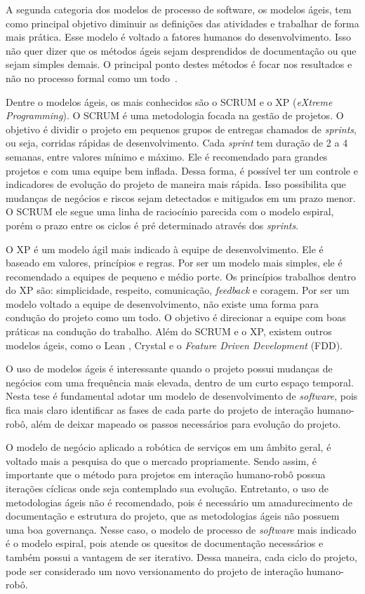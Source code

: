 A segunda categoria dos modelos de processo de software, os modelos ágeis, tem como principal objetivo diminuir as definições das atividades e trabalhar de forma mais prática. Esse modelo é voltado a fatores humanos do desenvolvimento. Isso não quer dizer que os métodos ágeis sejam desprendidos de documentação ou que sejam simples demais. O principal ponto destes métodos é focar nos resultados e não no processo formal como um todo~\cite{sommerville:2008}.

Dentre o modelos ágeis, os mais conhecidos são o SCRUM e o XP (\textit{eXtreme Programming}). O SCRUM é uma metodologia focada na gestão de projetos. O objetivo é dividir o projeto em pequenos grupos de entregas chamados de \textit{sprints}, ou seja, corridas rápidas de desenvolvimento. Cada \textit{sprint} tem duração de 2 a 4 semanas, entre valores mínimo e máximo. Ele é recomendado para grandes projetos e com uma equipe bem inflada. Dessa forma, é possível ter um controle e indicadores de evolução do projeto de maneira mais rápida. Isso possibilita que mudanças de negócios e riscos sejam detectados e mitigados em um prazo menor. O SCRUM ele segue uma linha de raciocínio parecida com o modelo espiral, porém o prazo entre os ciclos é pré determinado através dos \textit{sprints}.

O XP é um modelo ágil mais indicado à equipe de desenvolvimento. Ele é baseado em valores, princípios e regras. Por ser um modelo mais simples, ele é recomendado a equipes de pequeno e médio porte. Os princípios trabalhos dentro do XP são: simplicidade, respeito, comunicação, \textit{feedback} e coragem. Por ser um modelo voltado a equipe de desenvolvimento, não existe uma forma para condução do projeto como um todo. O objetivo é direcionar a equipe com boas práticas na condução do trabalho. Além do SCRUM e o XP, existem outros modelos ágeis, como o Lean , Crystal e o \textit{Feature Driven Development} (FDD).

O uso de modelos ágeis é interessante quando o projeto possui mudanças de negócios com uma frequência mais elevada, dentro de um curto espaço temporal. Nesta tese é fundamental adotar um modelo de desenvolvimento de \textit{software}, pois fica mais claro identificar as fases de cada parte do projeto de interação humano-robô, além de deixar mapeado os passos necessários para evolução do projeto.

O modelo de negócio aplicado a robótica de serviços em um âmbito geral, é voltado mais a pesquisa do que o mercado propriamente. Sendo assim, é importante que o método para projetos em interação humano-robô possua iterações cíclicas onde seja contemplado sua evolução. Entretanto, o uso de metodologias ágeis não é recomendado, pois é necessário um amadurecimento de documentação e estrutura do projeto, que as metodologias ágeis não possuem uma boa governança. Nesse caso, o modelo de processo de \textit{software} mais indicado é o modelo espiral, pois atende os quesitos de documentação necessários e também possui a vantagem de ser iterativo. Dessa maneira, cada ciclo do projeto, pode ser considerado um novo versionamento do projeto de interação humano-robô.

